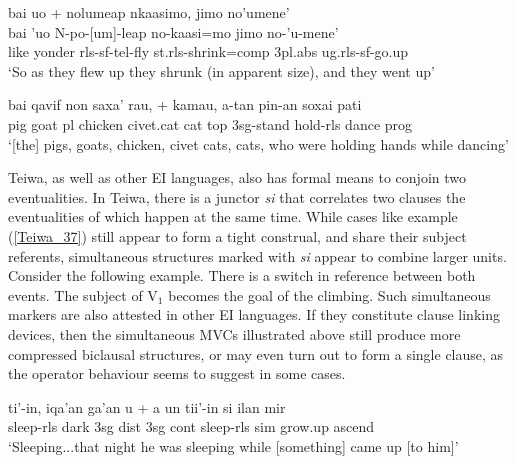 \ea \label{Pendau_4}
\gll bai uo + nolumeap nkaasimo, jimo no'umene' \\
bai 'uo N-po-[um]-leap no-kaasi=mo jimo no-'u-mene' \\
\glc like yonder \acs{rls}-\acs{sf}-\acs{tel}-fly \acs{st}.\acs{rls}-shrink=\acs{comp} 3\acs{pl}.\acs{abs} \acs{ug}.\acs{rls}-\acs{sf}-go.up \\
\glft `So as they flew up they shrunk (in apparent size), and they went up' \\ 
\z
\xe

\ea \label{Teiwa_37}
\gll bai qavif non saxa' rau, + kamau, a-tan pin-an soxai pati \\
pig goat \acs{pl} chicken civet.cat cat \acs{top} 3\acs{sg}-stand hold-\acs{rls} dance \acs{prog} \\
\glft `[the] pigs, goats, chicken, civet cats, cats, who were holding hands while dancing' \\ 
\z
\xe

Teiwa, as well as other EI languages, also has formal means to conjoin two eventualities. In Teiwa, there is a junctor \textit{si} that correlates two clauses the eventualities of which happen at the same time. While cases like example (\ref{Teiwa_37}) still appear to form a tight construal, and share their subject referents, simultaneous structures marked with \textit{si} appear to combine larger units. Consider the following example. There is a switch in reference between both events. The subject of V$_1$ becomes the goal of the climbing. Such simultaneous markers are also attested in other EI languages. If they constitute clause linking devices, then the simultaneous MVCs illustrated above still produce more compressed biclausal structures, or may even turn out to form a single clause, as the operator behaviour seems to suggest in some cases.

\ea \label{}
\gll ti'-in, iqa'an ga'an u + a un tii'-in si ilan mir \\
sleep-\acs{rls} dark 3\acs{sg} \acs{dist} 3\acs{sg} \acs{cont} sleep-\acs{rls} \acs{sim} grow.up ascend \\
\glft `Sleeping...that night he was sleeping while [something] came up [to him]' \\ 
\z
\xe

